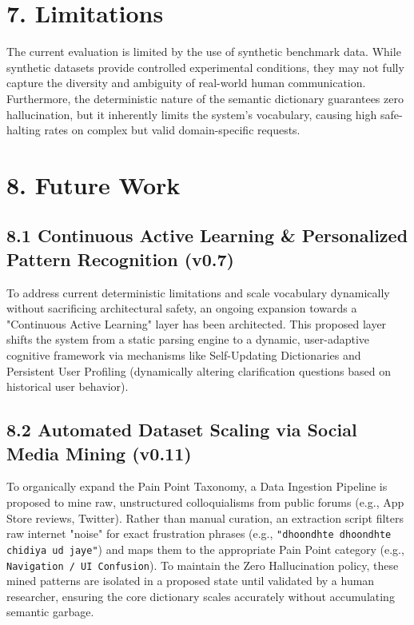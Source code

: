 \documentclass[11pt,a4paper]{article}
\begin{document}
\section{7. Limitations}

The current evaluation is limited by the use of synthetic benchmark data. While synthetic datasets provide controlled experimental conditions, they may not fully capture the diversity and ambiguity of real-world human communication. Furthermore, the deterministic nature of the semantic dictionary guarantees zero hallucination, but it inherently limits the system's vocabulary, causing high safe-halting rates on complex but valid domain-specific requests.



\section{8. Future Work}

\subsection{8.1 Continuous Active Learning & Personalized Pattern Recognition (v0.7)}
To address current deterministic limitations and scale vocabulary dynamically without sacrificing architectural safety, an ongoing expansion towards a "Continuous Active Learning" layer has been architected. 
This proposed layer shifts the system from a static parsing engine to a dynamic, user-adaptive cognitive framework via mechanisms like Self-Updating Dictionaries and Persistent User Profiling (dynamically altering clarification questions based on historical user behavior).

\subsection{8.2 Automated Dataset Scaling via Social Media Mining (v0.11)}
To organically expand the Pain Point Taxonomy, a Data Ingestion Pipeline is proposed to mine raw, unstructured colloquialisms from public forums (e.g., App Store reviews, Twitter). 
Rather than manual curation, an extraction script filters raw internet "noise" for exact frustration phrases (e.g., \texttt{"dhoondhte dhoondhte chidiya ud jaye"}) and maps them to the appropriate Pain Point category (e.g., \texttt{Navigation / UI Confusion}). To maintain the Zero Hallucination policy, these mined patterns are isolated in a proposed state until validated by a human researcher, ensuring the core dictionary scales accurately without accumulating semantic garbage.
\end{document}
